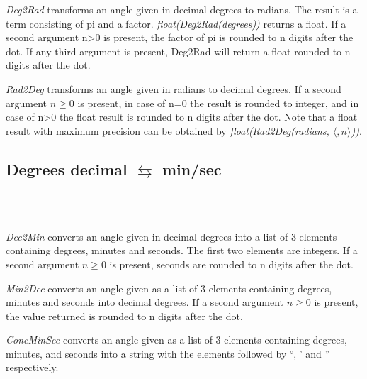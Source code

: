 \documentclass[../Maxima_Workbook.tex]{subfiles}
\begin{document}
\lz \emph{Deg2Rad} transforms an angle given in decimal degrees to radians. The result is a term consisting of pi and a factor. \emph{float(Deg2Rad(degrees))} returns a float. If a second argument n>0 is present, the factor of pi is rounded to n digits after the dot. If any third argument is present, Deg2Rad will return a float rounded to n digits after the dot.

\lz \emph{Rad2Deg} transforms an angle given in radians to decimal degrees. If a second argument $ n \geq 0 $ is present, in case of n=0 the result is rounded to integer, and in case of n>0 the float result is rounded to n digits after the dot. Note that a float result with maximum precision can be obtained by \emph{float(Rad2Deg(radians, $ \langle ,n \rangle $))}.

\subsection{Degrees decimal $ \leftrightarrows $ min/sec}

 \hfill {} \\
 \hfill {} \\
 \hfill {}

\lz \emph{Dec2Min} converts an angle given in decimal degrees into a list of 3 elements containing degrees, minutes and seconds. The first two elements are integers. If a second argument $ n \geq 0 $ is present, seconds are rounded to n digits after the dot. 

\lz \emph{Min2Dec} converts an angle given as a list of 3 elements containing degrees, minutes and seconds into decimal degrees. If a second argument $ n \geq 0 $ is present, the value returned is rounded to n digits after the dot. 

\lz \emph{ConcMinSec} converts an angle given as a list of 3 elements containing degrees, minutes, and seconds into a string with the elements followed by °, ' and '' respectively.
\end{document}
